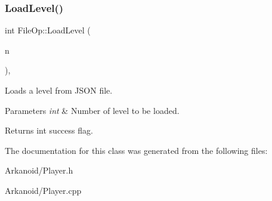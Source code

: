 \subsubsection{\texorpdfstring{Load\+Level()}{LoadLevel()}}
{\footnotesize\ttfamily int File\+Op\+::\+Load\+Level (\begin{DoxyParamCaption}\item[{int}]{n }\end{DoxyParamCaption})\hspace{0.3cm}{\ttfamily [static]}, {\ttfamily [protected]}}



Loads a level from J\+S\+ON file. 


\begin{DoxyParams}{Parameters}
{\em int} & Number of level to be loaded.\\
\hline
\end{DoxyParams}
\begin{DoxyReturn}{Returns}
int success flag. 
\end{DoxyReturn}


The documentation for this class was generated from the following files\+:\begin{DoxyCompactItemize}
\item 
Arkanoid/Player.\+h\item 
Arkanoid/Player.\+cpp\end{DoxyCompactItemize}
